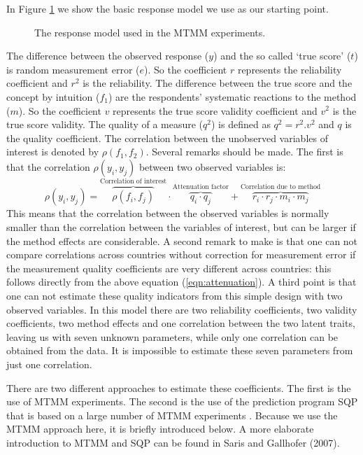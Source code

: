 \documentclass[a4paper,12pt]{article}
\begin{document}
In Figure \ref{fig:response} we show the basic response model \cite{Saris_design_2007} we use as our starting point. 

\begin{figure}[bh]
\caption{The response model used in the MTMM experiments.\label{fig:response}}
\end{figure}

The difference between the observed response ($y$) and the so called `true score' ($t$) is random measurement error ($e$). So the coefficient $r$ represents the reliability coefficient and $r^2$ is the reliability.
The difference between the true score and the concept by intuition ($f_1$) are the respondents' systematic reactions to the method ($m$). So the coefficient $v$ represents the true score validity coefficient and $v^2$ is the true score validity. The quality of a measure ($q^2$) is defined as  $q^2 =  r^2 . v^2$ and $q$ is the quality coefficient. The correlation between the unobserved variables of interest is denoted by $\rho(f_1,f_2)$.
Several remarks should be made. The first is that the correlation $\rho(y_i, y_j)$ between two observed variables is:
\begin{equation}
\rho(y_i, y_j) = \overbrace{\rho(f_i, f_j)}^{\textrm{Correlation of interest}} \cdot \overbrace{q_i \cdot q_j}^{\textrm{Attenuation factor}} + \overbrace{r_i \cdot r_j \cdot m_i \cdot m_j}^{\textrm{Correlation due to method}}
\label{eqn:attenuation}\end{equation}
This means that the correlation between the observed variables is normally smaller than the correlation between the variables of interest, but can be larger if the method effects are considerable. A second remark to make is that one can not compare correlations across countries without correction for measurement error if the measurement quality coefficients are very different across countries: this follows directly from the above equation (\ref{eqn:attenuation}). A third point is that one can not estimate these quality indicators from this simple design with two observed variables. In this model there are two reliability coefficients, two validity coefficients, two method effects and one correlation between the two latent traits, leaving us with seven unknown parameters, while only one correlation can be obtained from the data. It is impossible to estimate these seven parameters from just one correlation.  

There are two different approaches to estimate these coefficients. The first is the use of MTMM experiments. The second is the use of the prediction program SQP that is based on a large number of MTMM experiments \cite{oberski_sqp_}. Because we use the MTMM approach here, it is briefly introduced below. A more elaborate introduction to MTMM and SQP can be found in Saris and Gallhofer (2007).
\end{document}
